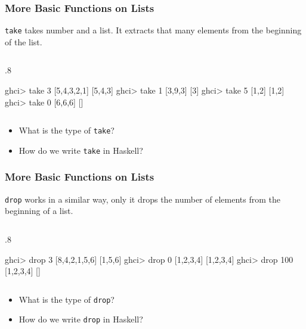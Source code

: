 \documentclass{beamer}
\newenvironment{codeblock}[1][.8]{%
\begin{columns}
\begin{column}{#1\linewidth}
\begin{exampleblock}{}}{%
\end{exampleblock}
\end{column}
\end{columns}}
\begin{document}
\begin{frame}[fragile]
\frametitle{More Basic Functions on Lists}

\verb+take+ takes number and a list. It extracts that many elements from the beginning of the list. 

\begin{codeblock}
\begin{hcode}
ghci> take 3 [5,4,3,2,1]  
[5,4,3]  
ghci> take 1 [3,9,3]  
[3]  
ghci> take 5 [1,2]  
[1,2]  
ghci> take 0 [6,6,6]  
[]  
\end{hcode}
\end{codeblock}

\begin{itemize}

\item What is the type of \verb+take+?

\item How do we write \verb+take+ in Haskell?

\end{itemize}

\end{frame}


\begin{frame}[fragile]
\frametitle{More Basic Functions on Lists}

\verb+drop+ works in a similar way, only it drops the number of elements from the beginning of a list.

\begin{codeblock}
\begin{hcode}
ghci> drop 3 [8,4,2,1,5,6]  
[1,5,6]  
ghci> drop 0 [1,2,3,4]  
[1,2,3,4]  
ghci> drop 100 [1,2,3,4]  
[] 
\end{hcode}
\end{codeblock}

\begin{itemize}

\item What is the type of \verb+drop+?

\item How do we write \verb+drop+ in Haskell?

\end{itemize}

\end{frame}

\end{document}
